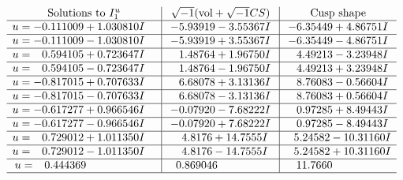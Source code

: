 \documentclass[1p]{elsarticle_modified}
\theoremstyle{definition}
\newcommand{\I}{\sqrt{-1}}
\begin{document}
$$\begin{array}{c|c|c}  
\text{Solutions to }I^u_{1}& \I (\text{vol} + \sqrt{-1}CS) & \text{Cusp shape}\\
 \hline 
\begin{aligned}
u &= -0.111009 + 1.030810 I\end{aligned}
 & -5.93919 - 3.55367 I & -6.35449 + 4.86751 I \\ \hline\begin{aligned}
u &= -0.111009 - 1.030810 I\end{aligned}
 & -5.93919 + 3.55367 I & -6.35449 - 4.86751 I \\ \hline\begin{aligned}
u &= \phantom{-}0.594105 + 0.723647 I\end{aligned}
 & \phantom{-}1.48764 + 1.96750 I & \phantom{-}4.49213 - 3.23948 I \\ \hline\begin{aligned}
u &= \phantom{-}0.594105 - 0.723647 I\end{aligned}
 & \phantom{-}1.48764 - 1.96750 I & \phantom{-}4.49213 + 3.23948 I \\ \hline\begin{aligned}
u &= -0.817015 + 0.707633 I\end{aligned}
 & \phantom{-}6.68078 + 3.13136 I & \phantom{-}8.76083 - 0.56604 I \\ \hline\begin{aligned}
u &= -0.817015 - 0.707633 I\end{aligned}
 & \phantom{-}6.68078 - 3.13136 I & \phantom{-}8.76083 + 0.56604 I \\ \hline\begin{aligned}
u &= -0.617277 + 0.966546 I\end{aligned}
 & -0.07920 - 7.68222 I & \phantom{-}0.97285 + 8.49443 I \\ \hline\begin{aligned}
u &= -0.617277 - 0.966546 I\end{aligned}
 & -0.07920 + 7.68222 I & \phantom{-}0.97285 - 8.49443 I \\ \hline\begin{aligned}
u &= \phantom{-}0.729012 + 1.011350 I\end{aligned}
 & \phantom{-}4.8176 + 14.7555 I & \phantom{-}5.24582 - 10.31160 I \\ \hline\begin{aligned}
u &= \phantom{-}0.729012 - 1.011350 I\end{aligned}
 & \phantom{-}4.8176 - 14.7555 I & \phantom{-}5.24582 + 10.31160 I \\ \hline\begin{aligned}
u &= \phantom{-}0.444369\phantom{ +0.000000I}\end{aligned}
 & \phantom{-}0.869046\phantom{ +0.000000I} & \phantom{-}11.7660\phantom{ +0.000000I}\\
 \hline 
 \end{array}$$\newpage\newpage\renewcommand{\arraystretch}{1}
\end{document}
